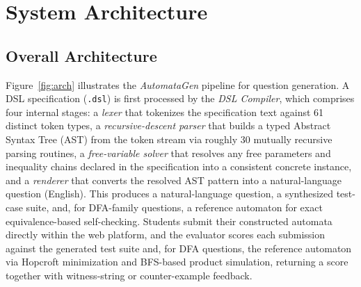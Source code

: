 \documentclass[sigconf]{acmart}
\begin{document}
\section{System Architecture}
\label{sec:design}

\subsection{Overall Architecture}

Figure~\ref{fig:arch} illustrates the \textit{AutomataGen} pipeline for question generation. A DSL specification (\texttt{.dsl}) is first processed by the \textit{DSL Compiler}, which comprises four internal stages: a \textit{lexer} that tokenizes the specification text against 61 distinct token types, a \textit{recursive-descent parser} that builds a typed Abstract Syntax Tree (AST) from the token stream via roughly 30 mutually recursive parsing routines, a \textit{free-variable solver} that resolves any free parameters and inequality chains declared in the specification into a consistent concrete instance, and a \textit{renderer} that converts the resolved AST pattern into a natural-language question (English). This produces a natural-language question, a synthesized test-case suite, and, for DFA-family questions, a reference automaton for exact equivalence-based self-checking. Students submit their constructed automata directly within the web platform, and the evaluator scores each submission against the generated test suite and, for DFA questions, the reference automaton via Hopcroft minimization and BFS-based product simulation, returning a score together with witness-string or counter-example feedback.
\end{document}
